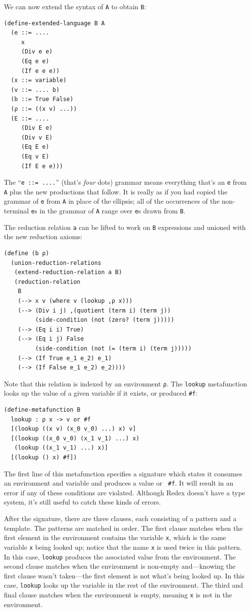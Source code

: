 We can now extend the syntax of {\tt A} to obtain {\tt B}:
\begin{verbatim}
(define-extended-language B A
  (e ::= ....
     x
     (Div e e)
     (Eq e e)
     (If e e e))
  (x ::= variable)
  (v ::= .... b)
  (b ::= True False) 
  (ρ ::= ((x v) ...))
  (E ::= ....
     (Div E e)
     (Div v E)
     (Eq E e)
     (Eq v E)
     (If E e e)))
\end{verbatim}
The ``{\tt e ::= ....}'' (that's \emph{four} dots) grammar means
everything that's an {\tt e} from {\tt A} plus the new productions
that follow.  It is really as if you had copied the grammar of {\tt e}
from {\tt A} in place of the ellipsis; all of the occurrences of the
non-terminal {\tt e}s in the grammar of {\tt A} range over {\tt e}s
drawn from {\tt B}.

The reduction relation {\tt a} can be lifted to work on {\tt B}
expressions and unioned with the new reduction axioms:
\begin{verbatim}
(define (b ρ)
  (union-reduction-relations 
   (extend-reduction-relation a B)
   (reduction-relation
    B
    (--> x v (where v (lookup ,ρ x)))
    (--> (Div i j) ,(quotient (term i) (term j))
         (side-condition (not (zero? (term j)))))    
    (--> (Eq i i) True)
    (--> (Eq i j) False
         (side-condition (not (= (term i) (term j)))))    
    (--> (If True e_1 e_2) e_1)
    (--> (If False e_1 e_2) e_2))))
\end{verbatim}
Note that this relation is indexed by an environment {\tt ρ}.
The {\tt lookup} metafunction looks up the value of a given
variable if it exists, or produced {\tt \#f}:
\begin{verbatim}
(define-metafunction B
  lookup : ρ x -> v or #f
  [(lookup ((x v) (x_0 v_0) ...) x) v]
  [(lookup ((x_0 v_0) (x_1 v_1) ...) x) 
   (lookup ((x_1 v_1) ...) x)]
  [(lookup () x) #f])
\end{verbatim}
The first line of this metafunction specifies a signature which states
it consumes an environment and variable and produces a value or {\tt
  \#f}.  It will result in an error if any of these conditions are
violated.  Although Redex doesn't have a type system, it's still
useful to catch these kinds of errors.

After the signature, there are three clauses, each consisting of a
pattern and a template.  The patterns are matched in order.  The first
clause matches when the first element in the environment contains the
variable {\tt x}, which is the same variable {\tt x} being looked up;
notice that the name {\tt x} is used twice in this pattern.  In this
case, {\tt lookup} produces the associated value from the environment.
The second clause matches when the environment is non-empty
and---knowing the first clause wasn't taken---the first element is not
what's being looked up.  In this case, {\tt lookup} looks up the
variable in the rest of the environment.  The third and final clause
matches when the environment is empty, meaning {\tt x} is not in the
environment.

